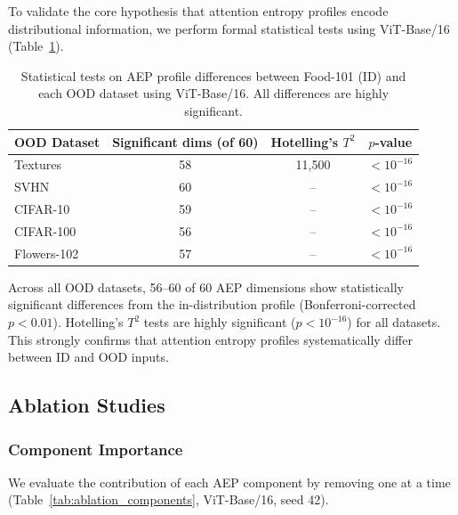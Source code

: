 \documentclass{article}
\begin{document}
To validate the core hypothesis that attention entropy profiles encode distributional information, we perform formal statistical tests using ViT-Base/16 (Table~\ref{tab:stats}).

\begin{table}[t]
\caption{Statistical tests on AEP profile differences between Food-101 (ID) and each OOD dataset using ViT-Base/16. All differences are highly significant.}
\label{tab:stats}
\centering
\small
\begin{tabular}{lccc}
\toprule
OOD Dataset & Significant dims (of 60) & Hotelling's $T^2$ & $p$-value \\
\midrule
Textures & 58 & 11,500 & $< 10^{-16}$ \\
SVHN & 60 & -- & $< 10^{-16}$ \\
CIFAR-10 & 59 & -- & $< 10^{-16}$ \\
CIFAR-100 & 56 & -- & $< 10^{-16}$ \\
Flowers-102 & 57 & -- & $< 10^{-16}$ \\
\bottomrule
\end{tabular}
\end{table}

Across all OOD datasets, 56--60 of 60 AEP dimensions show statistically significant differences from the in-distribution profile (Bonferroni-corrected $p < 0.01$). Hotelling's $T^2$ tests are highly significant ($p < 10^{-16}$) for all datasets. This strongly confirms that attention entropy profiles systematically differ between ID and OOD inputs.

\subsection{Ablation Studies}

\subsubsection{Component Importance}

We evaluate the contribution of each AEP component by removing one at a time (Table~\ref{tab:ablation_components}, ViT-Base/16, seed 42).
\end{document}
